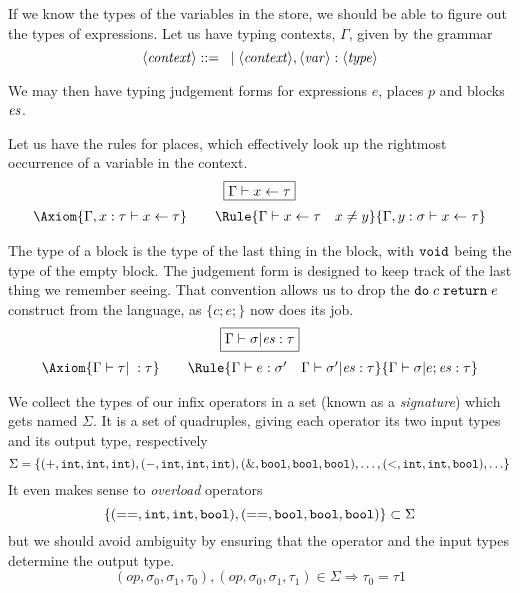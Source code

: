 \documentclass{article}
\begin{document}
If we know the types of the variables in the store, we should be able
to figure out the types of expressions. Let us have typing contexts, $\Gamma$,
given by the grammar
\[
  \langle \mathit{context} \rangle ::= \; \;|\; \langle \mathit{context} \rangle, \langle \mathit{var} \rangle : \langle \mathit{type} \rangle
\]

We may then have typing judgement forms for expressions $e$, places $p$
and blocks $\mathit{es}$.

Let us have the rules for places, which effectively look up the rightmost occurrence of a variable in the context.
\[\begin{array}{c}
    \fbx{\JPl \Gamma x\tau} \medskip \\

    \Axiom{\JPl{\Gamma,x:\tau} x\tau} \qquad
    \Rule{\JPl \Gamma x\tau \quad x\neq y}
         {\JPl{\Gamma,y:\sigma}x\tau}
  \end{array}  \]

The type of a block is the type of the last thing in the block, with $\mathtt{void}$ being the type of the empty block. The judgement form is designed to keep track of the last thing we remember seeing. That convention allows us to drop the $\mathtt{do}\;c\;\mathtt{return}\;e$
construct from the language, as $\{c;e;\}$ now does its job.
\[\begin{array}{c}
    \fbx{\JBl\Gamma\sigma\es\tau} \medskip \\

    \Axiom{\JBl\Gamma\tau\;\tau} \qquad
    \Rule{\JEx\Gamma e{\sigma'} \quad \JBl\Gamma{\sigma'}\es\tau}
         {\JBl\Gamma\sigma{e; \es}\tau}
  \end{array}  \]

We collect the types of our infix operators in a set (known as a \emph{signature})
which gets named $\Sigma$. It is a set of quadruples, giving each operator its
two input types and its output type, respectively
\[\Sigma = \{(\mathtt{+},\mathtt{int},\mathtt{int},\mathtt{int}),(\mathtt{-},\mathtt{int},\mathtt{int},\mathtt{int}),
  (\mathtt{\&},\mathtt{bool},\mathtt{bool},\mathtt{bool}),\ldots,
  (\mathtt{<},\mathtt{int},\mathtt{int},\mathtt{bool}),\ldots\}
\]
It even makes sense to \emph{overload} operators
\[
  \{(\mathtt{==},\mathtt{int},\mathtt{int},\mathtt{bool}),(\mathtt{==},\mathtt{bool},\mathtt{bool},\mathtt{bool})\}\subset\Sigma
\]
but we should avoid ambiguity by ensuring that the operator and the input types
determine the output type.
\[
  (\mathit{op},\sigma_0,\sigma_1,\tau_0), (\mathit{op},\sigma_0,\sigma_1,\tau_1)
  \in\Sigma \Rightarrow \tau_0 = \tau1
  \]
\end{document}
